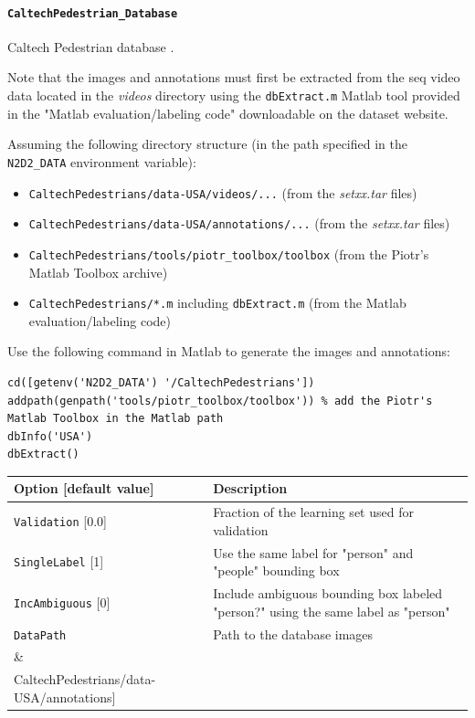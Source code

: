 \documentclass[a4paper,11pt,oneside]{article}
\newenvironment{myitemize}
{ \begin{itemize}
    \setlength{\itemsep}{0pt}
    \setlength{\parskip}{0pt}
    \setlength{\parsep}{0pt}     }
{ \end{itemize}                  }
\begin{document}
\paragraph{\texorpdfstring{\lstinline[basicstyle=\ttfamily\bfseries]!CaltechPedestrian_Database!}{CaltechPedestrian\_Database}}
Caltech Pedestrian database \citep{Dollar2009}.

Note that the images and annotations must first be extracted from the seq video
 data located in the \emph{videos} directory using the \lstinline!dbExtract.m!
 Matlab tool provided in the "Matlab evaluation/labeling code" downloadable on
 the dataset website.

Assuming the following directory structure (in the path specified in the \lstinline!N2D2_DATA! environment variable):
\begin{myitemize}
\item \lstinline!CaltechPedestrians/data-USA/videos/...!
(from the \emph{setxx.tar} files)
\item \lstinline!CaltechPedestrians/data-USA/annotations/...!
(from the \emph{setxx.tar} files)
\item \lstinline!CaltechPedestrians/tools/piotr_toolbox/toolbox!
(from the Piotr's Matlab Toolbox archive)
\item \lstinline!CaltechPedestrians/*.m! including \lstinline!dbExtract.m!
(from the Matlab evaluation/labeling code)
\end{myitemize}

Use the following command in Matlab to generate the images and annotations:
\begin{lstlisting}[style=matlab]
cd([getenv('N2D2_DATA') '/CaltechPedestrians'])
addpath(genpath('tools/piotr_toolbox/toolbox')) % add the Piotr's Matlab Toolbox in the Matlab path
dbInfo('USA')
dbExtract()
\end{lstlisting}

\begin{center}
 \begin{tabular}{| p{5cm} | p{10cm} | }
 \hline
 Option [default value] & Description\\
 \hline\hline
  \lstinline!Validation! [0.0] & Fraction of the learning set used for
  validation \\
  \lstinline!SingleLabel! [1] & Use the same label for "person" and "people"
  bounding box \\
  \lstinline!IncAmbiguous! [0] & Include ambiguous bounding box labeled
  "person?" using the same label as "person" \\
  \lstinline!DataPath! & Path to the database images \\
    & \\
  \lstinline!LabelPath! & Path to the database annotations \\
   \noindent [\lstinline!$N2D2_DATA!/ & \\
   \noindent CaltechPedestrians/data-USA/annotations] & \\
 \hline
\end{tabular}
\end{center}
\end{document}
